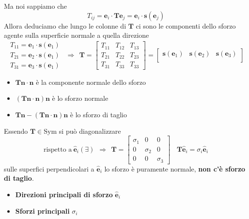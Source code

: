 \documentclass[10pt,a4paper,twoside]{book}
\begin{document}
Ma noi sappiamo che
\begin{equation*}
T_{ij} =\mathbf{e}_{i} \cdotp \mathbf{Te}_{j} =\mathbf{e}_{i} \cdotp \mathbf{s}(\mathbf{e}_{j})
\end{equation*}
Allora deduciamo che lungo le colonne di $\mathbf{T}$ ci sono le componenti dello sforzo agente sulla superficie normale a quella direzione
\begin{equation*}
\begin{array}{ c }
T_{11} =\mathbf{e}_{1} \cdotp \mathbf{s}(\mathbf{e}_{1})\\
T_{21} =\mathbf{e}_{2} \cdotp \mathbf{s}(\mathbf{e}_{1})\\
T_{31} =\mathbf{e}_{3} \cdotp \mathbf{s}(\mathbf{e}_{1})
\end{array} \ \ \Rightarrow \ \ \mathbf{T} =
\left[\begin{array}{c|c|c}
T_{11} & T_{12} & T_{13}\\
T_{21} & T_{22} & T_{23}\\
T_{31} & T_{33} & T_{33}
\end{array}\right] =
\left[\begin{array}{c|c|c}
\mathbf{s}(\mathbf{e}_{1}) & \mathbf{s}(\mathbf{e}_{2}) & \mathbf{s}(\mathbf{e}_{3})\\
\end{array}\right]
\end{equation*}
\begin{itemize}
\item $\mathbf{Tn} \cdotp \mathbf{n}$ è la componente normale dello sforzo
\item $(\mathbf{Tn} \cdotp \mathbf{n})\mathbf{n}$ è lo sforzo normale
\item $\mathbf{Tn} -(\mathbf{Tn} \cdotp \mathbf{n})\mathbf{n}$ è lo sforzo di taglio
\end{itemize}


Essendo $\mathbf{T} \in \mathrm{Sym}$ si può diagonalizzare
\begin{equation*}
\text{rispetto a} \ \hat{\mathbf{e}}_{i}( \exists ) \ \ \Rightarrow \ \ \mathbf{T} =\begin{bmatrix}
\sigma _{1} & 0 & 0\\
0 & \sigma _{2} & 0\\
0 & 0 & \sigma _{3}
\end{bmatrix} \ \ \ \ \mathbf{T}\hat{\mathbf{e}}_{i} =\sigma _{i}\hat{\mathbf{e}}_{i}
\end{equation*}
sulle superfici perpendicolari a $\hat{\mathbf{e}}_{i}$ lo sforzo è puramente normale, \textbf{non c'è sforzo di taglio}.
\begin{itemize}
\item \textbf{Direzioni principali di sforzo} $\hat{\mathbf{e}}_{i}$
\item \textbf{Sforzi principali} $\sigma _{i}$
\end{itemize}
\end{document}
